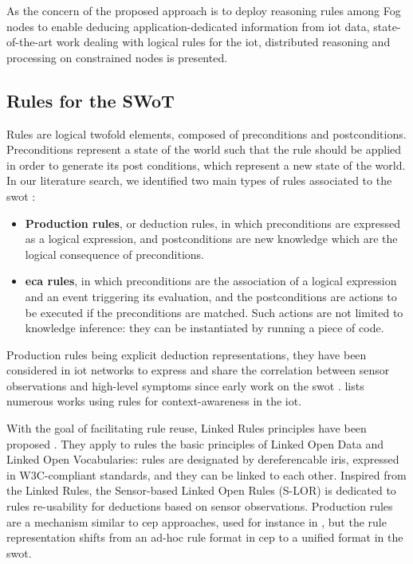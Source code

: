 \documentclass{iosart2c}
\begin{document}
As the concern of the proposed approach is to deploy reasoning rules among Fog nodes to enable deducing application-dedicated information from \gls{iot} data, state-of-the-art work dealing with logical rules for the \gls{iot}, distributed reasoning and processing on constrained nodes is presented.

\subsection{Rules for the SWoT}
\label{subs:rules}

Rules are logical twofold elements, composed of preconditions and postconditions.
Preconditions represent a state of the world such that the rule should be applied in order to generate its post conditions, which represent a new state of the world.
In our literature search, we identified two main types of rules associated to the \gls{swot} \cite{Boley2007}:
\begin{itemize}
	\item \textbf{Production rules}, or deduction rules, in which preconditions are expressed as a logical expression, and postconditions are new knowledge which are the logical consequence of preconditions.
	\item \textbf{\gls{eca} rules}, in which preconditions are the association of a logical expression and an event triggering its evaluation, and the postconditions are actions to be executed if the preconditions are matched. 
	Such actions are not limited to knowledge inference: they can be instantiated by running a piece of code.
\end{itemize}

Production rules being explicit deduction representations, they have been considered in \gls{iot} networks to express and share the correlation between sensor observations and high-level symptoms since early work on the \gls{swot} \cite{AmitSheth30}.
\cite{Sezer2018} lists numerous works using rules for context-awareness in the \gls{iot}.

With the goal of facilitating rule reuse, Linked Rules principles have been proposed \cite{Khandelwal2011}. 
They apply to rules the basic principles of Linked Open Data and Linked Open Vocabularies: rules are designated by dereferencable \gls{iri}s, expressed in W3C-compliant standards, and they can be linked to each other.
Inspired from the Linked Rules, the Sensor-based Linked Open Rules (S-LOR) \cite{Gyrard2017} is dedicated to rules re-usability for deductions based on sensor observations.
Production rules are a mechanism similar to \gls{cep} approaches, used for instance in \cite{ZangLi55}, but the rule representation shifts from an ad-hoc rule format in \gls{cep} to a unified format in the \gls{swot}. 
\end{document}
